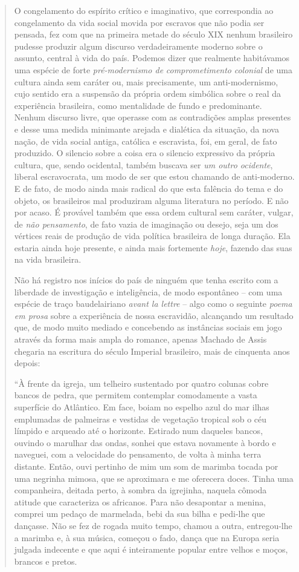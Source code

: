\begin{quote}
O congelamento do espírito crítico e imaginativo, que correspondia ao
congelamento da vida social movida por escravos que não podia ser
pensada, fez com que na primeira metade do século XIX nenhum brasileiro
pudesse produzir algum discurso verdadeiramente moderno sobre o assunto,
central à vida do país. Podemos dizer que realmente habitávamos uma
espécie de forte \emph{pré-modernismo de} \emph{comprometimento}
\emph{colonial} de uma cultura ainda sem caráter ou, mais precisamente,
um anti-modernismo, cujo sentido era a suspensão da própria ordem
simbólica sobre o real da experiência brasileira, como mentalidade de
fundo e predominante. Nenhum discurso livre, que operasse com as
contradições amplas presentes e desse uma medida minimante arejada e
dialética da situação, da nova nação, de vida social antiga, católica e
escravista, foi, em geral, de fato produzido. O silencio sobre a coisa
era o silencio expressivo da própria cultura, que, sendo ocidental,
também buscava ser \emph{um outro ocidente}, liberal escravocrata, um
modo de ser que estou chamando de anti-moderno. E de fato, de modo ainda
mais radical do que esta falência do tema e do objeto, os brasileiros
mal produziram alguma literatura no período. E não por acaso. É provável
também que essa ordem cultural sem caráter, vulgar, de \emph{não
pensamento}, de fato vazia de imaginação ou desejo, seja um dos vértices
reais de produção de vida política brasileira de longa duração. Ela
estaria ainda hoje presente, e ainda mais fortemente \emph{hoje},
fazendo das suas na vida brasileira.

Não há registro nos inícios do país de ninguém que tenha escrito com a
liberdade de investigação e inteligência, de modo espontâneo -- com uma
espécie de traço baudelairiano \emph{avant la lettre} -- algo como o
seguinte \emph{poema em prosa} sobre a experiência de nossa escravidão,
alcançando um resultado que, de modo muito mediado e concebendo as
instâncias sociais em jogo através da forma mais ampla do romance,
apenas Machado de Assis chegaria na escritura do século Imperial
brasileiro, mais de cinquenta anos depois:

``À frente da igreja, um telheiro sustentado por quatro colunas cobre
bancos de pedra, que permitem contemplar comodamente a vasta superfície
do Atlântico. Em face, boiam no espelho azul do mar ilhas emplumadas de
palmeiras e vestidas de vegetação tropical sob o céu límpido e arqueado
até o horizonte. Estirado num daqueles bancos, ouvindo o marulhar das
ondas, sonhei que estava novamente à bordo e naveguei, com a velocidade
do pensamento, de volta à minha terra distante. Então, ouvi pertinho de
mim um som de marimba tocada por uma negrinha mimosa, que se aproximara
e me oferecera doces. Tinha uma companheira, deitada perto, à sombra da
igrejinha, naquela cômoda atitude que caracteriza os africanos. Para não
desapontar a menina, comprei um pedaço de marmelada, bebi da sua bilha e
pedi-lhe que dançasse. Não se fez de rogada muito tempo, chamou a outra,
entregou-lhe a marimba e, à sua música, começou o fado, dança que na
Europa seria julgada indecente e que aqui é inteiramente popular entre
velhos e moços, brancos e pretos.


\end{quote}

